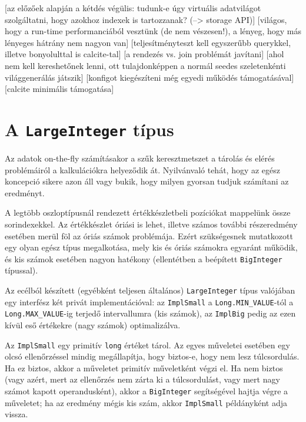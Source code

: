 \documentclass[
    parspace,
    noindent,
    nohyp,
]{elteiktdk}[2023/04/10]
\begin{document}
[az előzőek alapján a kétdés végülis: tudunk-e úgy virtuális adatvilágot szolgáltatni, hogy azokhoz indexek is tartozzanak? (--> storage API)]
[világos, hogy a run-time performanciából vesztünk (de nem vészesen!), a lényeg, hogy más lényeges hátrány nem nagyon van]
[teljesítményteszt kell egyszerűbb querykkel, illetve bonyolulttal is calcite-tal]
[a rendezés vs. join problémát javítani]
[ahol nem kell kereshetőnek lenni, ott tulajdonképpen a normál seedes szeletenkénti világgenerálás játszik]
[konfigot kiegészíteni még egyedi működés támogatásával]
[calcite minimális támogatása]





\section{A \texttt{LargeInteger} típus}

Az adatok on-the-fly számításakor a szűk keresztmetszet
a tárolás és elérés problémáiról a kalkulációkra helyeződik át.
Nyilvánvaló tehát, hogy az egész koncepció sikere azon áll vagy bukik,
hogy milyen gyorsan tudjuk számítani az eredményt.

A legtöbb oszloptípusnál rendezett értékkészletbeli pozíciókat mappelünk össze sorindexekkel.
Az értékkészlet óriási is lehet,
illetve számos további részeredmény esetében merül föl az óriás számok problémája.
Ezért szükségesnek mutatkozott egy olyan egész típus megalkotása,
mely kis és óriás számokra egyaránt működik,
és kis számok esetében nagyon hatékony (ellentétben a beépített \texttt{BigInteger} típussal).

Az ecélból készített (egyébként teljesen általános) \texttt{LargeInteger} típus
valójában egy interfész két privát implementációval:
az \texttt{ImplSmall} a \texttt{Long.MIN\_VALUE}-tól a \texttt{Long.MAX\_VALUE}-ig
terjedő intervallumra (kis számok),
az \texttt{ImplBig} pedig az ezen kívül eső értékekre (nagy számok) optimalizálva.

Az \texttt{ImplSmall} egy primitív \texttt{long} értéket tárol.
Az egyes műveletei esetében egy olcsó ellenőrzéssel mindig megállapítja,
hogy biztos-e, hogy nem lesz túlcsordulás.
Ha ez biztos, akkor a műveletet primitív műveletként végzi el.
Ha nem biztos
(vagy azért, mert az ellenőrzés nem zárta ki a túlcsordulást,
vagy mert nagy számot kapott operandusként),
akkor a \texttt{BigInteger} segítségével hajtja végre a műveletet;
ha az eredmény mégis kis szám, akkor \texttt{ImplSmall} példányként adja vissza.
\end{document}
